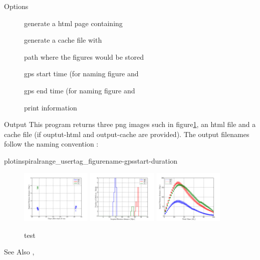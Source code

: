\begin{manpage}{}
\begin{mansection}{Options}
\begin{description}
\item[] generate a html page containing
\item[] generate a cache file with
\item[]     path where the figures would be stored
\item[]    gps start time (for naming figure and
\item[]   gps end time (for naming figure and
\item[] print information   
\end{description}
\end{mansection}


\begin{mansection}{Output}
This program returns three png images such in
figure\ref{fig:lalapps_plotinspiralrange}, an html file and a cache file (if
ouptut-html and output-cache are provided). The output filenames follow the
naming convention : 

plotinspiralrange\_usertag\_figurename-gpsstart-duration


\begin{figure}[ht]
{\includegraphics[width=0.30\textwidth]{./plotinspiralrange_playground_range_plot-849974770-2419200.png}}
{\includegraphics[width=0.30\textwidth]{./plotinspiralrange_playground_range_hist-849974770-2419200.png}}
{\includegraphics[width=0.30\textwidth]{./plotinspiralrange_playground_range_mass-849974770-2419200.png}}
\caption{\label{fig:lalapps_plotinspiralrange} test}
\end{figure}



\end{mansection}



\begin{mansection}{See Also}
, 
\end{mansection}

\end{manpage}

\clearpage
